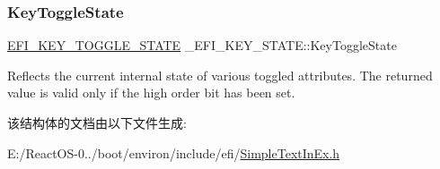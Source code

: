 \subsubsection{\texorpdfstring{Key\+Toggle\+State}{KeyToggleState}}
{\footnotesize\ttfamily \hyperlink{_simple_text_in_ex_8h_a5c5344195ec40b3af99801ca3ccd6b2a}{E\+F\+I\+\_\+\+K\+E\+Y\+\_\+\+T\+O\+G\+G\+L\+E\+\_\+\+S\+T\+A\+TE} \+\_\+\+E\+F\+I\+\_\+\+K\+E\+Y\+\_\+\+S\+T\+A\+T\+E\+::\+Key\+Toggle\+State}

Reflects the current internal state of various toggled attributes. The returned value is valid only if the high order bit has been set. 

该结构体的文档由以下文件生成\+:\begin{DoxyCompactItemize}
\item 
E\+:/\+React\+O\+S-\/0../boot/environ/include/efi/\hyperlink{_simple_text_in_ex_8h}{Simple\+Text\+In\+Ex.\+h}\end{DoxyCompactItemize}
